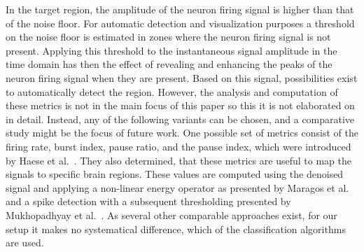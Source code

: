 \documentclass{vgtc}                          %
\begin{document}
In the target region, the amplitude of the neuron firing signal is higher than that of the noise floor. For automatic detection and visualization purposes a threshold on the noise floor is estimated in zones where the neuron firing signal is not present. Applying this threshold to the instantaneous signal amplitude in the time domain has then the effect of revealing and enhancing the peaks of the neuron firing signal when they are present. Based on this signal, possibilities exist to automatically detect the region. However, the analysis and computation of these metrics is not in the main focus of this paper so this it is not elaborated on in detail. Instead, any of the following variants can be chosen, and a comparative study might be the focus of future work. One possible set of metrics consist of the firing rate, burst index, pause ratio, and the pause index, which were introduced by Haese et al.~\cite{Haese2005}. They also determined, that these metrics are useful to map the signals to specific brain regions. These values are computed using the denoised signal and applying a non-linear energy operator as presented by Maragos et al.~\cite{Maragos1993} and a spike detection with a subsequent thresholding presented by Mukhopadhyay et al.~\cite{Mukhopadhyay1998}. As several other comparable approaches exist, for our setup it makes no systematical difference, which of the classification algorithms are used.
\end{document}
